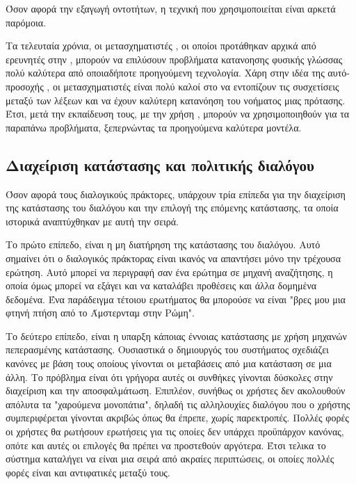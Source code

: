 Όσον αφορά την εξαγωγή οντοτήτων, η τεχνική που χρησιμοποιείται είναι αρκετά παρόμοια.

Τα τελευταία χρόνια, οι μετασχηματιστές , οι οποίοι προτάθηκαν αρχικά από ερευνητές στην \cite{attention2017}, μπορούν να επιλύσουν προβλήματα κατανοησης φυσικής γλώσσας πολύ καλύτερα από οποιαδήποτε προηγούμενη τεχνολογία. Χάρη στην ιδέα της αυτό-προσοχής , οι μετασχηματιστές είναι πολύ καλοί στο να εντοπίζουν τις συσχετίσεις μεταξύ των λέξεων και να έχουν καλύτερη κατανόηση του νοήματος μιας πρότασης. Έτσι, μετά την εκπαίδευση τους, με την χρήση , μπορούν να χρησιμοποιηθούν για τα παραπάνω προβλήματα, ξεπερνώντας τα προηγούμενα καλύτερα μοντέλα.

\subsection{Διαχείριση κατάστασης και πολιτικής διαλόγου}

Όσον αφορά τους διαλογικούς πράκτορες, υπάρχουν τρία επίπεδα για την διαχείριση της κατάστασης του διαλόγου και την επιλογή της επόμενης κατάστασης, τα οποία ιστορικά αναπτύχθηκαν με αυτή την σειρά.

Το πρώτο επίπεδο, είναι η μη διατήρηση της κατάστασης του διαλόγου. Αυτό σημαίνει ότι ο διαλογικός πράκτορας είναι ικανός να απαντήσει μόνο την τρέχουσα ερώτηση. Αυτό μπορεί να περιγραφή σαν ένα ερώτημα σε μηχανή αναζήτησης, η οποία όμως μπορεί να εξάγει και να καταλάβει προθέσεις και άλλα δομημένα δεδομένα. Ένα παράδειγμα τέτοιου ερωτήματος θα μπορούσε να είναι "βρες μου μια φτηνή πτήση από το Άμστερνταμ στην Ρώμη".

Το δεύτερο επίπεδο, είναι η υπαρξη κάποιας έννοιας κατάστασης με χρήση μηχανών πεπερασμένης κατάστασης. Ουσιαστικά ο δημιουργός του συστήματος σχεδιάζει κανόνες με βάση τους οποίους γίνονται οι μεταβάσεις από μια κατάσταση σε μια άλλη. Το πρόβλημα είναι ότι γρήγορα αυτές οι συνθήκες γίνονται δύσκολες στην διαχείριση και την αποσφαλμάτωση. Επιπλέον, συνήθως οι χρήστες δεν ακολουθούν απόλυτα τα "χαρούμενα μονοπάτια", δηλαδή τις αλληλουχίες διαλόγου που ο χρήστης συμπεριφέρεται γίνονται ακριβώς όπως θα έπρεπε, χωρίς παρεκτροπές. Πολλές φορές οι χρήστες θα ρωτήσουν ερωτήσεις για τις οποίες δεν υπάρχει προϋπάρχον κανόνας, οπότε και αυτές οι επιλογές θα πρέπει να προστεθούν αργότερα. Έτσι τελικα το σύστημα καταλήγει να είναι μια σειρά από ακραίες περιπτώσεις, οι οποίες πολλές φορές είναι και αντιφατικές μεταξύ τους.

